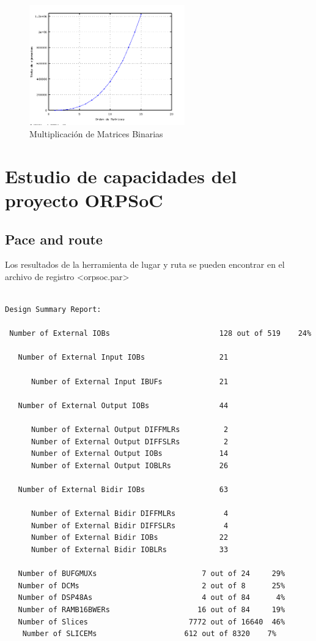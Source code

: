 \begin{figure}[h!]
 	\begin{center}
  	\includegraphics[width=0.6\textwidth,keepaspectratio=true]{./images/matrices}
  	\caption{Multiplicación de Matrices Binarias}
 	\end{center}
	\end{figure}

\newpage
	\section{Estudio de capacidades del proyecto ORPSoC}

		\subsection{Pace and route}	
Los resultados de la herramienta de lugar y ruta se pueden encontrar en el archivo de registro <orpsoc.par>

\begin{lstlisting}[frame=single,caption={Resultado de PAR},label={lst:salidas},breaklines]

Design Summary Report:

 Number of External IOBs                         128 out of 519    24%

   Number of External Input IOBs                 21

      Number of External Input IBUFs             21

   Number of External Output IOBs                44

      Number of External Output DIFFMLRs          2
      Number of External Output DIFFSLRs          2
      Number of External Output IOBs             14
      Number of External Output IOBLRs           26

   Number of External Bidir IOBs                 63

      Number of External Bidir DIFFMLRs           4
      Number of External Bidir DIFFSLRs           4
      Number of External Bidir IOBs              22
      Number of External Bidir IOBLRs            33

   Number of BUFGMUXs                        7 out of 24     29%
   Number of DCMs                            2 out of 8      25%
   Number of DSP48As                         4 out of 84      4%
   Number of RAMB16BWERs                    16 out of 84     19%
   Number of Slices                       7772 out of 16640  46%
    Number of SLICEMs                    612 out of 8320    7%

\end{lstlisting}

